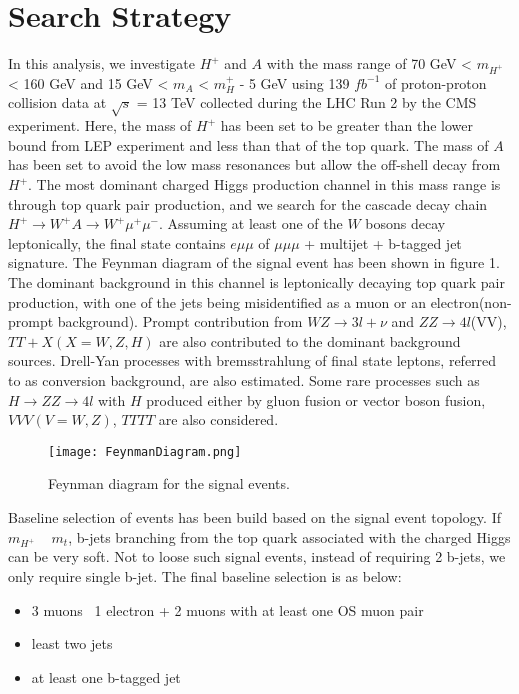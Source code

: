 \documentclass[
12pt, %
a4paper, %
oneside, %
headinclude,footinclude, %
BCOR5mm, %
]{scrartcl}
\begin{document}
\section{Search Strategy}
In this analysis, we investigate $H^+$ and $A$ with the mass range of
70 GeV < $m_{H^+}$ < 160 GeV and 15 GeV < $m_A$ < $m_H^+$ - 5 GeV using 139 $fb^{-1}$
of proton-proton collision data at $\sqrt{s}$ = 13 TeV collected during the LHC Run 2
by the CMS experiment. Here, the mass of $H^+$ has been set to be greater than the lower bound
from LEP experiment and less than that of the top quark. The mass of $A$ has been set to avoid
the low mass resonances but allow the off-shell decay from $H^+$. The most dominant
charged Higgs production channel in this mass range is through top quark pair production, and we search for the 
cascade decay chain $H^+ \rightarrow W^+A \rightarrow W^+\mu^+\mu^-$. Assuming at least one
of the $W$ bosons decay leptonically, the final state contains $e\mu\mu$ of $\mu\mu\mu$ + multijet + b-tagged jet
signature. The Feynman diagram of the signal event has been shown in figure 1. 
The dominant background in this channel is leptonically decaying top quark pair production, 
with one of the jets being misidentified as a muon or an electron(non-prompt background).
Prompt contribution from $WZ \rightarrow 3l + \nu$ and $ZZ \rightarrow 4l$(VV), $TT + X(X=W, Z, H)$
are also contributed to the dominant background sources. Drell-Yan processes with bremsstrahlung
of final state leptons, referred to as conversion background, are also estimated. Some rare processes
such as $H \rightarrow ZZ \rightarrow 4l$ with $H$ produced either by gluon fusion or vector boson fusion,
$VVV (V=W, Z)$, $TTTT$ are also considered.

\begin{figure}[htp]
    \centering
    \texttt{[image: FeynmanDiagram.png]}
    \caption{Feynman diagram for the signal events.}
    \label{fig:Feynman}
\end{figure}

Baseline selection of events has been build based on the signal event topology.
If $m_{H^+}$ ~ $m_t$, b-jets branching from the top quark associated with the charged Higgs
can be very soft. Not to loose such signal events, instead of requiring 2 b-jets, we only require
single b-jet. The final baseline selection is as below:
\begin{itemize}
    \item 3 muons \ 1 electron + 2 muons with at least one OS muon pair
    \item least two jets
    \item at least one b-tagged jet
\end{itemize}
\end{document}
